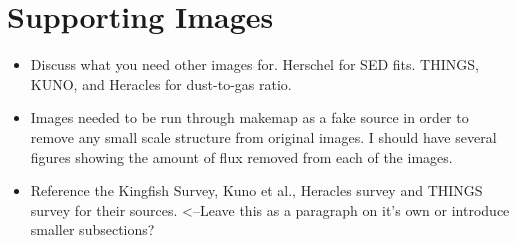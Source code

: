 \section{Supporting Images}

\begin{itemize}
  \item Discuss what you need other images for.  Herschel for SED fits.  THINGS, KUNO, and Heracles for dust-to-gas ratio.
  \item Images needed to be run through makemap as a fake source in order to remove any small scale structure from original images.  I should have several figures showing the amount of flux removed from each of the images.
  \item Reference the Kingfish Survey, Kuno et al., Heracles survey and THINGS survey for their sources.  <--Leave this as a paragraph on it's own or introduce smaller subsections?
  
\end{itemize}

